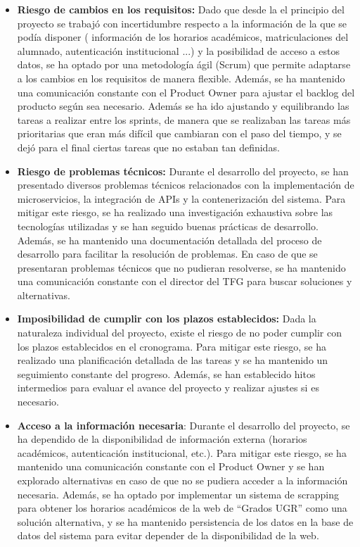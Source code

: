 \begin{itemize}
    \item \textbf{Riesgo de cambios en los requisitos:} Dado que desde la el principio del proyecto se trabajó con incertidumbre respecto a la información de la que se podía disponer ( información de los horarios académicos, matriculaciones del alumnado, autenticación institucional ...) y la posibilidad de acceso a estos datos, se ha optado por una metodología ágil (Scrum) que permite adaptarse a los cambios en los requisitos de manera flexible. Además, se ha mantenido una comunicación constante con el Product Owner para ajustar el backlog del producto según sea necesario.
    \newline\newline Además se ha ido ajustando y equilibrando las tareas a realizar entre los sprints, de manera que se realizaban las tareas más prioritarias que eran más difícil que cambiaran con el paso del tiempo, y se dejó para el final ciertas tareas que no estaban tan definidas.

    \item \textbf{Riesgo de problemas técnicos:} Durante el desarrollo del proyecto, se han presentado diversos problemas técnicos relacionados con la implementación de microservicios, la integración de APIs y la contenerización del sistema. Para mitigar este riesgo, se ha realizado una investigación exhaustiva sobre las tecnologías utilizadas y se han seguido buenas prácticas de desarrollo. Además, se ha mantenido una documentación detallada del proceso de desarrollo para facilitar la resolución de problemas.
    \newline\newline En caso de que se presentaran problemas técnicos que no pudieran resolverse, se ha mantenido una comunicación constante con el director del TFG para buscar soluciones y alternativas.

    \item \textbf{Imposibilidad de cumplir con los plazos establecidos:} Dada la naturaleza individual del proyecto, existe el riesgo de no poder cumplir con los plazos establecidos en el cronograma. Para mitigar este riesgo, se ha realizado una planificación detallada de las tareas y se ha mantenido un seguimiento constante del progreso. Además, se han establecido hitos intermedios para evaluar el avance del proyecto y realizar ajustes si es necesario.
    
    \item \textbf{Acceso a la información necesaria}: Durante el desarrollo del proyecto, se ha dependido de la disponibilidad de información externa (horarios académicos, autenticación institucional, etc.). Para mitigar este riesgo, se ha mantenido una comunicación constante con el Product Owner y se han explorado alternativas en caso de que no se pudiera acceder a la información necesaria. Además, se ha optado por implementar un sistema de scrapping para obtener los horarios académicos de la web de ``Grados UGR'' como una solución alternativa, y se ha mantenido persistencia de los datos en la base de datos del sistema para evitar depender de la disponibilidad de la web.
\end{itemize}

